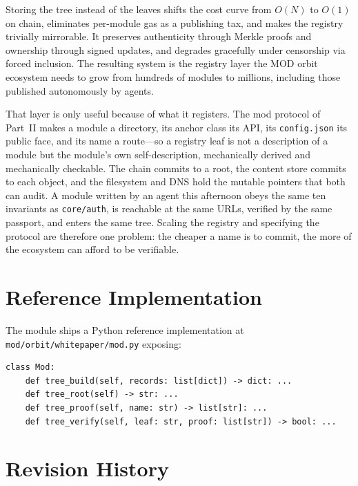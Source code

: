 \documentclass[11pt,a4paper]{article}
\begin{document}
Storing the tree instead of the leaves shifts the cost curve from $O(N)$ to $O(1)$ on chain, eliminates per-module gas as a publishing tax, and makes the registry trivially mirrorable. It preserves authenticity through Merkle proofs and ownership through signed updates, and degrades gracefully under censorship via forced inclusion. The resulting system is the registry layer the MOD orbit ecosystem needs to grow from hundreds of modules to millions, including those published autonomously by agents.

That layer is only useful because of what it registers. The mod protocol of Part~II makes a module a directory, its anchor class its API, its \texttt{config.json} its public face, and its name a route---so a registry leaf is not a description of a module but the module's own self-description, mechanically derived and mechanically checkable. The chain commits to a root, the content store commits to each object, and the filesystem and DNS hold the mutable pointers that both can audit. A module written by an agent this afternoon obeys the same ten invariants as \texttt{core/auth}, is reachable at the same URLs, verified by the same passport, and enters the same tree. Scaling the registry and specifying the protocol are therefore one problem: the cheaper a name is to commit, the more of the ecosystem can afford to be verifiable.

\appendix

\section{Reference Implementation}

The module ships a Python reference implementation at \texttt{mod/orbit/whitepaper/mod.py} exposing:

\begin{lstlisting}[style=python]
class Mod:
    def tree_build(self, records: list[dict]) -> dict: ...
    def tree_root(self) -> str: ...
    def tree_proof(self, name: str) -> list[str]: ...
    def tree_verify(self, leaf: str, proof: list[str]) -> bool: ...
\end{lstlisting}

\section{Revision History}
\end{document}
